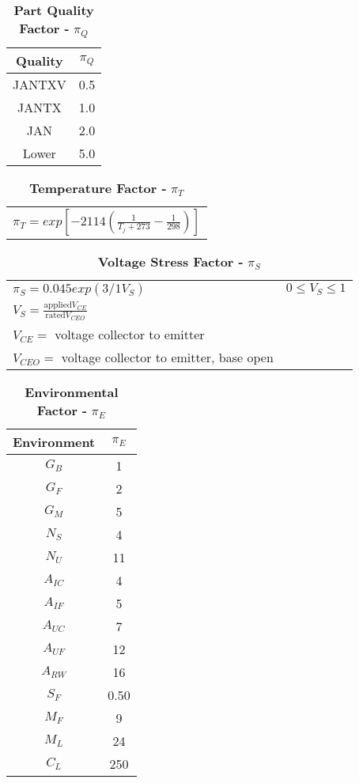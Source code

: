 \begin{table}[h]
\caption{\textbf{Part Quality Factor -} $\pi_{Q}$}
\label{table:baseFaileRateBjtHigh}
\begin{tabular}{|c|c|} \hline
\rowcolor{Gray}
\textbf{Quality} & $\pi_{Q}$ \\ \hline
JANTXV & 0.5 \\ \hline
JANTX & 1.0 \\ \hline
JAN & 2.0 \\ \hline
Lower & 5.0 \\ \hline
\end{tabular}
\end{table}


\begin{table}[h]
\caption{\textbf{Temperature Factor -} $\pi_{T}$}
\label{table:tempFactorBjtHigh}
\begin{tabular}{l} 
$\pi_{T} = exp[-2114(\frac{1}{T_j + 273} - \frac{1}{298})]$
\end{tabular}
\end{table}


\begin{table}[h]
\caption{\textbf{Voltage Stress Factor -} $\pi_{S}$}
\label{table:voltStressFactorTransHigh}
\begin{tabular}{ll} 
$\pi_{S} = 0.045exp(3/1V_{S})$ 					& $0 \leq V_{S} \leq 1$		\\
$V_{S} = \frac{\text{applied} V_{CE}}{\text{rated} V_{CEO}}$			& 	\\
$V_{CE} =$ voltage collector to emitter								&	\\
$V_{CEO} = $ voltage collector to emitter, base open					& \\
\end{tabular}
\end{table}


\begin{table}[h]
\caption{\textbf{Environmental Factor -} $\pi_{E}$}
\label{table:enviroFactorTransHigh}
\begin{tabular}{|c|c|} \hline
\rowcolor{Gray}
\textbf{Environment} & $\pi_{E}$ \\ \hline
$G_{B}$ & 1 \\ \hline
$G_{F}$ & 2 \\ \hline
$G_{M}$ & 5 \\ \hline
$N_{S}$ & 4 \\ \hline
$N_{U}$ & 11 \\ \hline
$A_{IC}$ & 4 \\ \hline
$A_{IF}$ & 5 \\ \hline
$A_{UC}$ & 7 \\ \hline
$A_{UF}$ & 12 \\ \hline
$A_{RW}$ & 16 \\ \hline
$S_{F}$ & 0.50 \\ \hline
$M_{F}$ & 9 \\ \hline
$M_{L}$ & 24 \\ \hline
$C_{L}$ & 250 \\ \hline
\end{tabular}
\end{table}

